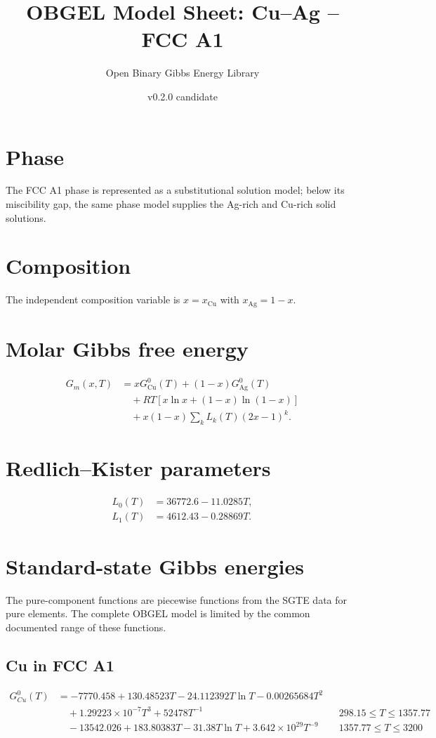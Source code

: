 \documentclass[11pt]{article}
\title{OBGEL Model Sheet: Cu--Ag -- FCC A1}
\author{Open Binary Gibbs Energy Library}
\date{v0.2.0 candidate}
\begin{document}
\maketitle
\section*{Phase}
The FCC A1 phase is represented as a substitutional solution model; below its miscibility gap, the same phase model supplies the Ag-rich and Cu-rich solid solutions.

\section*{Composition}
The independent composition variable is $x=x_{\mathrm{Cu}}$ with $x_{\mathrm{Ag}}=1-x$.

\section*{Molar Gibbs free energy}
\begin{align*}
G_m(x,T) &= xG^0_{\mathrm{Cu}}(T)+(1-x)G^0_{\mathrm{Ag}}(T)\\
&\quad+RT\left[x\ln x+(1-x)\ln(1-x)\right]\\
&\quad+x(1-x)\sum_k L_k(T)(2x-1)^k.
\end{align*}

\section*{Redlich--Kister parameters}
\begin{align*}
L_0(T)&=36772.6 - 11.0285T,\\
L_1(T)&=4612.43 - 0.28869T.
\end{align*}

\section*{Standard-state Gibbs energies}
The pure-component functions are piecewise functions from the SGTE data for pure elements. The complete OBGEL model is limited by the common documented range of these functions.

\subsection*{Cu in FCC A1}
\begin{align*}
G^0_{Cu}(T) &=  - 7770.458 + 130.48523T - 24.112392T\ln T - 0.00265684T^{2}\\[4pt]
&\quad+ 1.29223\times 10^{-7}T^{3} + 52478T^{-1} && 298.15 \le T \le 1357.77\\[4pt]
&\quad - 13542.026 + 183.80383T - 31.38T\ln T + 3.642\times 10^{29}T^{-9} && 1357.77 \le T \le 3200
\end{align*}
\end{document}
